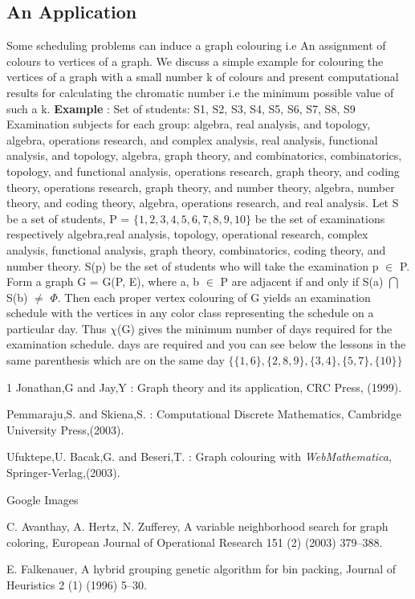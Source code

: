 \documentclass{article}
\begin{document}
\subsection{An Application}
Some scheduling problems can induce a graph colouring i.e An assignment of colours to vertices of a graph. We discuss a simple example for colouring the vertices of a graph with a small number k of colours and present computational results for calculating the chromatic number i.e the minimum possible value of such a k. \hfill \break
\textbf{Example} : Set of students: S1, S2, S3, S4, S5, S6, S7, S8, S9 Examination subjects
for each group: {algebra, real analysis, and topology}, {algebra, operations
research, and complex analysis}, {real analysis, functional analysis, and
topology}, {algebra, graph theory, and combinatorics}, {combinatorics, topology,
and functional analysis}, {operations research, graph theory, and coding
theory}, {operations research, graph theory, and number theory}, {algebra,
number theory, and coding theory}, {algebra, operations research, and real
analysis}. \hfill \break
Let S be a set of students, P = \(\{1, 2, 3, 4, 5, 6, 7, 8, 9, 10\}\) be the set of
examinations respectively algebra,real analysis, topology, operational research,
complex analysis, functional analysis, graph theory, combinatorics, coding
theory, and number theory. S(p) be the set of students who will take the
examination p \(\in\) P. Form a graph G = G(P, E), where a, b \(\in\) P are adjacent if and only if S(a) \( \bigcap\) S(b) \(\neq\)  \(\Phi\). Then each proper vertex colouring of G yields an examination schedule with the vertices in any color class representing the
schedule on a particular day. Thus \(\chi\)(G) gives the minimum number of days required for the examination schedule.  \hfill {} days are required and you can see below the lessons in the same parenthesis which are on the same day
\(\{\{1, 6\}, \{2, 8, 9\}, \{3, 4\}, \{5, 7\}, \{10\}\}\)

  \begin{thebibliography} {1}
 Jonathan,G and Jay,Y : Graph theory and its application, CRC Press, (1999).

 Pemmaraju,S. and Skiena,S. : Computational Discrete Mathematics, Cambridge University Press,(2003).

 Ufuktepe,U. Bacak,G. and Beseri,T. : Graph colouring with \textit{WebMathematica}, Springer-Verlag,(2003).

 Google Images

 C. Avanthay, A. Hertz, N. Zufferey, A variable neighborhood search for graph coloring, European Journal of Operational Research 151 (2) (2003) 379–388. 

 E. Falkenauer, A hybrid grouping genetic algorithm for bin packing, Journal of Heuristics 2 (1) (1996) 5–30.


\end{thebibliography}
\end{document}

